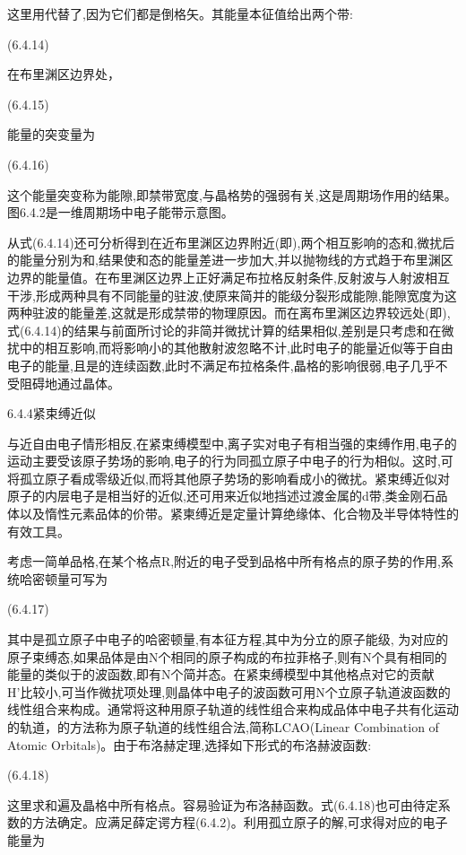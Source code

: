 这里用代替了,因为它们都是倒格矢。其能量本征值给出两个带: 

 (6.4.14)

在布里渊区边界处，

 	(6.4.15)

能量的突变量为

 (6.4.16)

这个能量突变称为能隙,即禁带宽度,与晶格势的强弱有关,这是周期场作用的结果。图6.4.2是一维周期场中电子能带示意图。



从式(6.4.14)还可分析得到在近布里渊区边界附近(即),两个相互影响的态和,微扰后的能量分别为和,结果使和态的能量差进一步加大,并以抛物线的方式趋于布里渊区边界的能量值。在布里渊区边界上正好满足布拉格反射条件,反射波与人射波相互干涉,形成两种具有不同能量的驻波,使原来简并的能级分裂形成能隙,能隙宽度为这两种驻波的能量差,这就是形成禁带的物理原因。而在离布里渊区边界较远处(即),式(6.4.14)的结果与前面所讨论的非简并微扰计算的结果相似,差别是只考虑和在微扰中的相互影响,而将影响小的其他散射波忽略不计,此时电子的能量近似等于自由电子的能量,且是的连续函数,此时不满足布拉格条件,晶格的影响很弱,电子几乎不受阻碍地通过晶体。



6.4.4紧束缚近似

与近自由电子情形相反,在紧束缚模型中,离子实对电子有相当强的束缚作用,电子的运动主要受该原子势场的影响,电子的行为同孤立原子中电子的行为相似。这时,可将孤立原子看成零级近似,而将其他原子势场的影响看成小的微扰。紧束缚近似对原子的内层电子是相当好的近似,还可用来近似地挡述过渡金属的d带,类金刚石品体以及惰性元素品体的价带。紧柬缚近是定量计算绝缘体、化合物及半导体特性的有效工具。

考虑一简单品格,在某个格点R,附近的电子受到品格中所有格点的原子势的作用,系统哈密顿量可写为

 	(6.4.17)

其中是孤立原子中电子的哈密顿量,有本征方程,其中为分立的原子能级, 为对应的原子束缚态,如果品体是由N个相同的原子构成的布拉菲格子,则有N个具有相同的能量的类似于的波函数,即有N个简并态。在紧束缚模型中其他格点对它的贡献H'比较小,可当作微扰项处理,则晶体中电子的波函数可用N个立原子轨道波函数的线性组合来构成。通常将这种用原子轨道的线性组合来构成品体中电子共有化运动的轨道，的方法称为原子轨道的线性组合法,简称LCAO(Linear Combination of Atomic Orbitals)。由于布洛赫定理,选择如下形式的布洛赫波函数:

 	(6.4.18)

这里求和遍及晶格中所有格点。容易验证为布洛赫函数。式(6.4.18)也可由待定系数的方法确定。应满足薛定谔方程(6.4.2)。利用孤立原子的解,可求得对应的电子能量为

